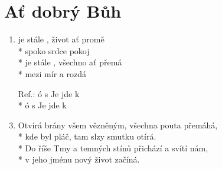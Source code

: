\section{Ať dobrý Bůh}
\begin{enumerate}
\item	{}   je stále , život  ať promě \\*
	spoko srdce  pokoj   \\*
	   je stále , všechno   ať přemá \\*
	mezi  mír a  rozdá  

\item[Ref.:]	 ó s   Je jde k    \\*
 ó s   Je jde k  

\item	Otvírá brány všem vězněným, všechna pouta přemáhá,\\*
	kde byl pláč, tam slzy smutku otírá.\\*
	Do říše Tmy a temných stínů přichází a svítí nám,\\*
	v jeho jménu nový život začíná.
\end{enumerate}
